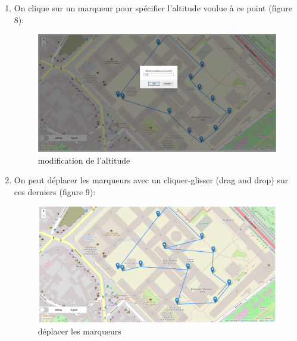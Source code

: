 \documentclass{article}
\begin{document}
\begin{enumerate}
	\item On clique sur un marqueur pour spécifier l'altitude voulue à ce point (figure 8):\\
	\begin{figure}[!h]
 	\begin{center}
 	\includegraphics[scale=0.42]{capt6.PNG}
 	\caption{modification de l'altitude}
 	\end{center}
 	\end{figure}
 	\newpage 
 	
 	\item On peut déplacer les marqueurs avec un cliquer-glisser (drag and drop) sur ces derniers (figure 9):\\
 	\begin{figure}[!h]
 	\begin{center}
 	\includegraphics[scale=0.42]{capt7.png}
 	\caption{déplacer les marqueurs}
 	\end{center}
 	\end{figure}
 	

\end{enumerate}
\end{document}

